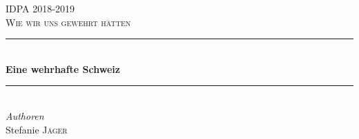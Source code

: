 \begin{titlepage} %
	\newcommand{\HRule}{\rule{\linewidth}{0.5mm}} %
	
	\center %
	
	
	\textsc{\LARGE IDPA 2018-2019}\\[1.5cm] %
	
	\textsc{\Large Wie wir uns gewehrt hätten}\\[0.5cm] %
	
	
	\HRule\\[0.4cm]
	
	{\huge\bfseries Eine wehrhafte Schweiz}\\[0.4cm] %
	
	\HRule\\[1.5cm]
	
	
	
	{\large\textit{Authoren}}\\
	        Stefanie \textsc{Jäger} %
            

\end{titlepage}
